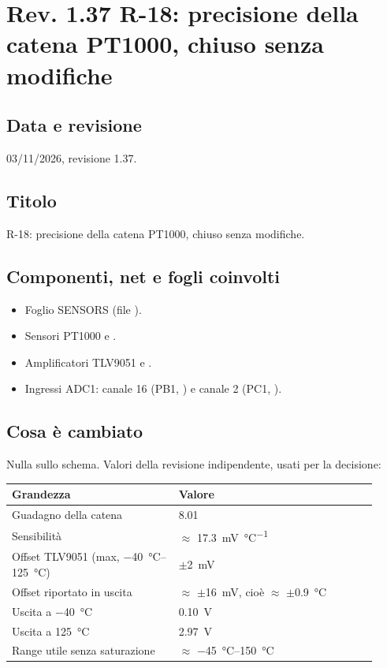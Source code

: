 \clearpage
\section[Rev. 1.37 -- R-18: precisione della catena PT1000]{Rev. 1.37 \textendash{} R-18: precisione della catena PT1000, chiuso senza modifiche}

\subsection{Data e revisione}
03/11/2026, revisione 1.37.

\subsection{Titolo}
R-18: precisione della catena PT1000, chiuso senza modifiche.

\subsection{Componenti, net e fogli coinvolti}
\begin{itemize}
\item Foglio SENSORS (file ).
\item Sensori PT1000  e .
\item Amplificatori TLV9051  e .
\item Ingressi ADC1: canale 16 (PB1, ) e canale 2 (PC1, ).
\end{itemize}

\subsection{Cosa è cambiato}
Nulla sullo schema. Valori della revisione indipendente, usati per la decisione:

{\small{}
\begin{tabular}{@{}>{\raggedright\arraybackslash}p{0.42\linewidth}>{\raggedright\arraybackslash}p{0.5\linewidth}@{}}
\toprule
\textbf{Grandezza} & \textbf{Valore}\\
\midrule
Guadagno della catena & \num{8,01}\\
Sensibilità & $\approx$ \SI{17,3}{\milli\volt\per\celsius}\\
Offset TLV9051 (max, \SIrange{-40}{125}{\celsius}) & $\pm$\SI{2}{\milli\volt}\\
Offset riportato in uscita & $\approx$ $\pm$\SI{16}{\milli\volt}, cioè $\approx$ $\pm$\SI{0,9}{\celsius}\\
Uscita a \SI{-40}{\celsius} & \SI{0,10}{\volt}\\
Uscita a \SI{+125}{\celsius} & \SI{2,97}{\volt}\\
Range utile senza saturazione & $\approx$ \SIrange{-45}{150}{\celsius}\\
\bottomrule
\end{tabular}}

